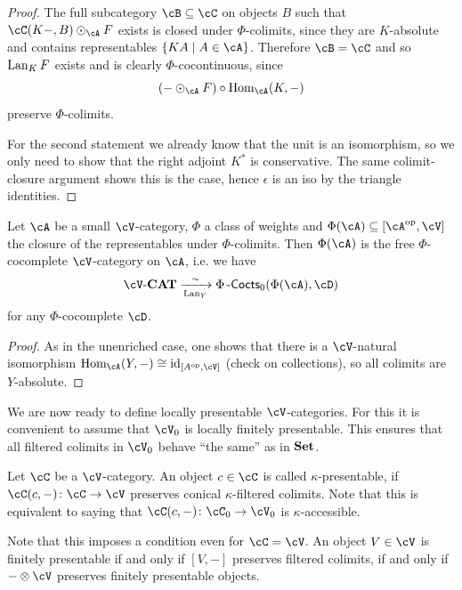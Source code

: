 \documentclass[a4paper,11pt,oneside,openany]{scrbook}
\begin{document}
\begin{proof}
    The full subcategory $ \cB \subseteq \cC $ on objects $ B $ such that $ \cC(K-,B)\odot _\cA F $ exists is closed under $ \Phi $-colimits, since they are $ K $-absolute and contains representables $ \{ KA \mid A \in \cA \} $.
    Therefore $ \cB = \cC $ and so $ \operatorname{Lan}_K F $ exists and is clearly $ \Phi $-cocontinuous, since
    \begin{displaymath}
	(- \odot _\cA F) \circ \Hom_\cA (K,-)
    \end{displaymath}
    preserve $ \Phi $-colimits.

    For the second statement we already know that the unit is an isomorphism, so we only need to show that the right adjoint $ K^* $ is conservative.
    The same colimit-closure argument shows this is the case, hence $ \epsilon $ is an iso by the triangle identities.
\end{proof}
\begin{cor}
    Let $ \cA $ be a small $ \cV $-category, $ \Phi $ a class of weights and $ \Phi(\cA) \subseteq [\cA^{\op},\cV] $ the closure of the representables under $ \Phi $-colimits.
    Then $ \Phi(\cA) $ is the free $ \Phi $-cocomplete $ \cV $-category on $ \cA $, i.e. we have 
    \begin{displaymath}
	\cV\text{-}\CAT \xrightarrow[\Lan_Y]{\sim} \Phi\Cocts_0(\Phi(\cA),\cD)
    \end{displaymath}
    for any $ \Phi $-cocomplete $ \cD $.
\end{cor}
\begin{proof}
    As in the unenriched case, one shows that there is a $ \cV $-natural isomorphism $ \Hom_\cA(Y,-)\iso \id_{[A^{\op}, \cV]} $ (check on collections),
    so all colimits are $ Y $-absolute.
\end{proof}
We are now ready to define locally presentable $ \cV $-categories.
For this it is convenient to assume that $ \cV_0 $ is locally finitely presentable.
This ensures that all filtered colimits in $ \cV_0 $ behave ``the same'' as in $ {\normalfont\textbf{Set}} $.

\begin{defn}
    Let $ \cC $ be a $ \cV $-category.
    An object $ c \in \cC $ is called $ \kappa $-presentable, if $ \cC(c,-) \from \cC \to \cV $ preserves conical $ \kappa $-filtered colimits.
    Note that this is equivalent to saying that $ \cC (c,-)\from \cC_0 \to \cV_0 $ is $ \kappa $-accessible.
\end{defn}

Note that this imposes a condition even for $ \cC = \cV $.
An object $ V \in \cV $ is finitely presentable if and only if $ [V,-] $ preserves filtered colimits, if and only if $ -\otimes \cV $ preserves finitely presentable objects.
\end{document}
